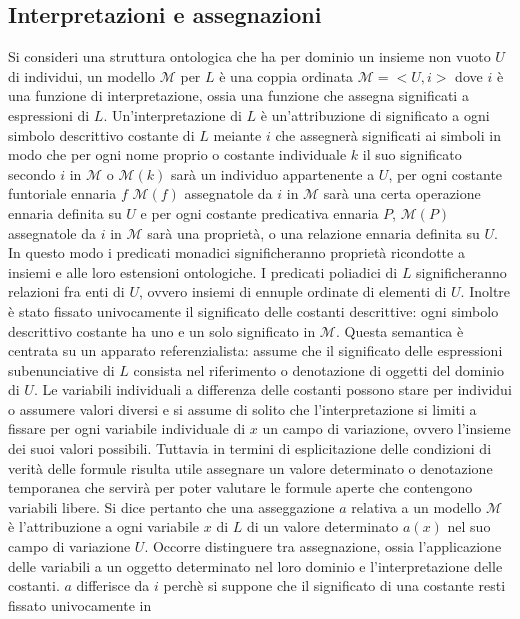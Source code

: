 \subsection{Interpretazioni e assegnazioni}
Si consideri una struttura ontologica che ha per dominio un insieme non vuoto $U$ di individui, un modello $\mathcal{M}$ per $L$ \`e una coppia ordinata $\mathcal{M}=<U, i>$ dove $i$ \`e una funzione di 
interpretazione, ossia una funzione che assegna significati a espressioni di $L$. Un'interpretazione di  $L$ \`e un'attribuzione di significato a ogni simbolo descrittivo costante di $L$ meiante $i$ che 
assegner\`a significati ai simboli in modo che per ogni nome proprio o costante individuale $k$ il suo significato secondo $i$ in $\mathcal{M}$ o $\mathcal{M}(k)$ sar\`a un individuo appartenente a $U$, per 
ogni costante funtoriale ennaria $f$ $\mathcal{M}(f)$ assegnatole da $i$ in $\mathcal{M}$ sar\`a una certa operazione ennaria definita su $U$ e per ogni costante predicativa ennaria $P$, $\mathcal{M}(P)$ 
assegnatole da $i$ in $\mathcal{M}$ sar\`a una propriet\`a, o una relazione ennaria definita su $U$. In questo modo i predicati monadici significheranno propriet\`a ricondotte a insiemi e alle loro estensioni 
ontologiche. I predicati poliadici di $L$ significheranno relazioni fra enti di $U$, ovvero insiemi di ennuple ordinate di elementi di $U$. Inoltre \`e stato fissato univocamente il significato delle costanti 
descrittive: ogni simbolo descrittivo costante ha uno e un solo significato in $\mathcal{M}$. Questa semantica \`e centrata su un apparato referenzialista: assume che il significato delle espressioni 
subenunciative di $L$ consista nel riferimento o denotazione di oggetti del dominio di $U$. Le variabili individuali a differenza delle costanti possono stare per individui o assumere valori diversi e si assume di 
solito che l'interpretazione si limiti a fissare per ogni variabile individuale di $x$ un campo di variazione, ovvero l'insieme dei suoi valori possibili. Tuttavia in termini di esplicitazione delle condizioni di verit\`a 
delle formule risulta utile assegnare un valore determinato o denotazione temporanea che servir\`a per poter valutare le formule aperte che contengono variabili libere. Si dice pertanto che una asseggazione 
$a$ relativa a un modello $\mathcal{M}$ \`e l'attribuzione a ogni variabile $x$ di $L$ di un valore determinato $a(x)$ nel suo campo di variazione $U$. Occorre distinguere tra assegnazione, ossia 
l'applicazione delle variabili a un oggetto determinato nel loro dominio e l'interpretazione delle costanti. $a$ differisce da $i$ perch\`e si suppone che il significato di una costante resti fissato univocamente in 
